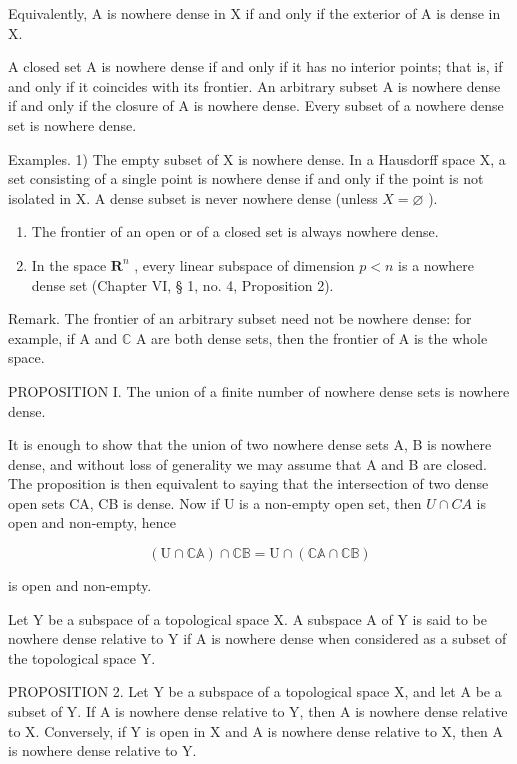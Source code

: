 Equivalently, A is nowhere dense in X if and only if the exterior of A is dense in X.

A closed set A is nowhere dense if and only if it has no interior points; that is, if and only if it coincides with its frontier. An arbitrary subset A is nowhere dense if and only if the closure of A is nowhere dense. Every subset of a nowhere dense set is nowhere dense.

Examples. 1) The empty subset of X is nowhere dense. In a Hausdorff space X, a set consisting of a single point is nowhere dense if and only if the point is not isolated in X. A dense subset is never nowhere dense (unless \(X = \varnothing\) ).

\begin{enumerate}
\def\labelenumi{\arabic{enumi})}
\setcounter{enumi}{1}
\item
  The frontier of an open or of a closed set is always nowhere dense.
\item
  In the space \(\mathbf{R}^n\) , every linear subspace of dimension \(p < n\) is a nowhere dense set (Chapter VI, § 1, no. 4, Proposition 2).
\end{enumerate}

Remark. The frontier of an arbitrary subset need not be nowhere dense: for example, if A and \(\mathbb{C}\) A are both dense sets, then the frontier of A is the whole space.

PROPOSITION I. The union of a finite number of nowhere dense sets is nowhere dense.

It is enough to show that the union of two nowhere dense sets A, B is nowhere dense, and without loss of generality we may assume that A and B are closed. The proposition is then equivalent to saying that the intersection of two dense open sets CA, CB is dense. Now if U is a non-empty open set, then \(U \cap CA\) is open and non-empty, hence

\[
\left(\mathrm{U} \cap \mathbb {C A}\right) \cap \mathbb {C B} = \mathrm{U} \cap \left(\mathbb {C A} \cap \mathbb {C B}\right)
\]

is open and non-empty.

Let Y be a subspace of a topological space X. A subspace A of Y is said to be nowhere dense relative to Y if A is nowhere dense when considered as a subset of the topological space Y.

PROPOSITION 2. Let Y be a subspace of a topological space X, and let A be a subset of Y. If A is nowhere dense relative to Y, then A is nowhere dense relative to X. Conversely, if Y is open in X and A is nowhere dense relative to X, then A is nowhere dense relative to Y.

